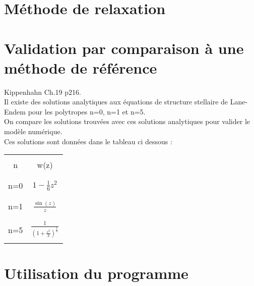 \documentclass[a4paper,10pt]{article}
\begin{document}
\section{Méthode de relaxation}



\section{Validation par comparaison à une méthode de référence}
Kippenhahn Ch.19 p216.\\
Il existe des solutions analytiques aux équations de structure stellaire de Lane-Endem pour les polytropes n=0, n=1 et n=5.\\
On compare les solutions trouvées avec ces solutions analytiques pour valider le modèle numérique.\\
Ces solutions sont données dans le tableau ci dessous :\\
\begin{tabular}{cc}
\hline 
\\
n & w(z)\\
\\
\hline 
\\
n=0 & $1 - \frac{1}{6} z^2$\\
\\
\hline 
\\
n=1 & $\frac{\sin(z)}{z}$\\
\\
\hline 
\\
n=5 & $\frac{1}{(1+\frac{z^2}{3})^{\frac{1}{2}}}$\\
\\
\hline 
\end{tabular}

\section{Utilisation du programme}
\end{document}
